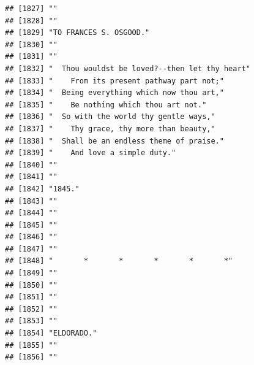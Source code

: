 \documentclass{article}\usepackage[]{graphicx}\usepackage[]{color}
\makeatletter
\newenvironment{kframe}{%
 \def\at@end@of@kframe{}%
 \ifinner\ifhmode%
  \def\at@end@of@kframe{\end{minipage}}%
  \begin{minipage}{\columnwidth}%
 \fi\fi%
 \def\FrameCommand##1{\hskip\@totalleftmargin \hskip-\fboxsep
 \colorbox{shadecolor}{##1}\hskip-\fboxsep
     \hskip-\linewidth \hskip-\@totalleftmargin \hskip\columnwidth}%
 \MakeFramed {\advance\hsize-\width
   \@totalleftmargin\z@ \linewidth\hsize
   \@setminipage}}%
 {\par\unskip\endMakeFramed%
 \at@end@of@kframe}
\newenvironment{knitrout}{}{} %
\makeatother
\begin{document}
\begin{knitrout}
\begin{kframe}
\begin{verbatim}
## [1827] ""                                                                            
## [1828] ""                                                                            
## [1829] "TO FRANCES S. OSGOOD."                                                       
## [1830] ""                                                                            
## [1831] ""                                                                            
## [1832] "  Thou wouldst be loved?--then let thy heart"                                
## [1833] "    From its present pathway part not;"                                      
## [1834] "  Being everything which now thou art,"                                      
## [1835] "    Be nothing which thou art not."                                          
## [1836] "  So with the world thy gentle ways,"                                        
## [1837] "    Thy grace, thy more than beauty,"                                        
## [1838] "  Shall be an endless theme of praise."                                      
## [1839] "    And love a simple duty."                                                 
## [1840] ""                                                                            
## [1841] ""                                                                            
## [1842] "1845."                                                                       
## [1843] ""                                                                            
## [1844] ""                                                                            
## [1845] ""                                                                            
## [1846] ""                                                                            
## [1847] ""                                                                            
## [1848] "       *       *       *       *       *"                                    
## [1849] ""                                                                            
## [1850] ""                                                                            
## [1851] ""                                                                            
## [1852] ""                                                                            
## [1853] ""                                                                            
## [1854] "ELDORADO."                                                                   
## [1855] ""                                                                            
## [1856] ""                                                                            

\end{verbatim}
\end{kframe}
\end{knitrout}
\end{document}
